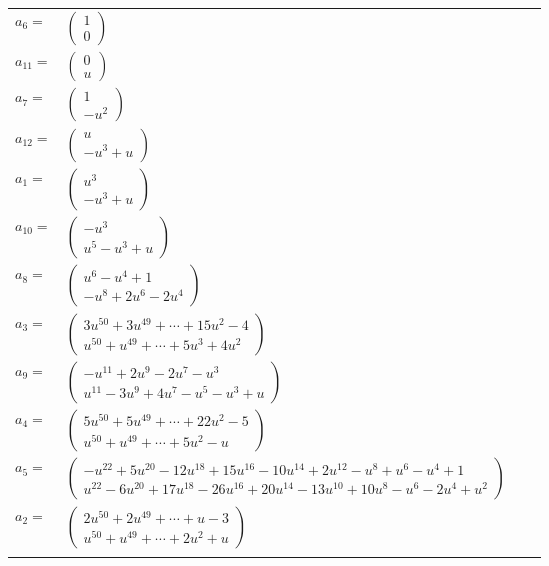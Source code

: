 \documentclass[1p]{elsarticle_modified}
\theoremstyle{definition}
\begin{document}
\begin{tabular}{m{7pt} m{180pt} m{7pt} m{180pt} }
\flushright $a_{6}=$&$\begin{pmatrix}1\\0\end{pmatrix}$ \\
\flushright $a_{11}=$&$\begin{pmatrix}0\\u\end{pmatrix}$ \\
\flushright $a_{7}=$&$\begin{pmatrix}1\\- u^2\end{pmatrix}$ \\
\flushright $a_{12}=$&$\begin{pmatrix}u\\- u^3+u\end{pmatrix}$ \\
\flushright $a_{1}=$&$\begin{pmatrix}u^3\\- u^3+u\end{pmatrix}$ \\
\flushright $a_{10}=$&$\begin{pmatrix}- u^3\\u^5- u^3+u\end{pmatrix}$ \\
\flushright $a_{8}=$&$\begin{pmatrix}u^6- u^4+1\\- u^8+2 u^6-2 u^4\end{pmatrix}$ \\
\flushright $a_{3}=$&$\begin{pmatrix}3 u^{50}+3 u^{49}+\cdots+15 u^2-4\\u^{50}+u^{49}+\cdots+5 u^3+4 u^2\end{pmatrix}$ \\
\flushright $a_{9}=$&$\begin{pmatrix}- u^{11}+2 u^9-2 u^7- u^3\\u^{11}-3 u^9+4 u^7- u^5- u^3+u\end{pmatrix}$ \\
\flushright $a_{4}=$&$\begin{pmatrix}5 u^{50}+5 u^{49}+\cdots+22 u^2-5\\u^{50}+u^{49}+\cdots+5 u^2- u\end{pmatrix}$ \\
\flushright $a_{5}=$&$\begin{pmatrix}- u^{22}+5 u^{20}-12 u^{18}+15 u^{16}-10 u^{14}+2 u^{12}- u^8+u^6- u^4+1\\u^{22}-6 u^{20}+17 u^{18}-26 u^{16}+20 u^{14}-13 u^{10}+10 u^8- u^6-2 u^4+u^2\end{pmatrix}$ \\
\flushright $a_{2}=$&$\begin{pmatrix}2 u^{50}+2 u^{49}+\cdots+u-3\\u^{50}+u^{49}+\cdots+2 u^2+u\end{pmatrix}$\\&\end{tabular}
\end{document}
